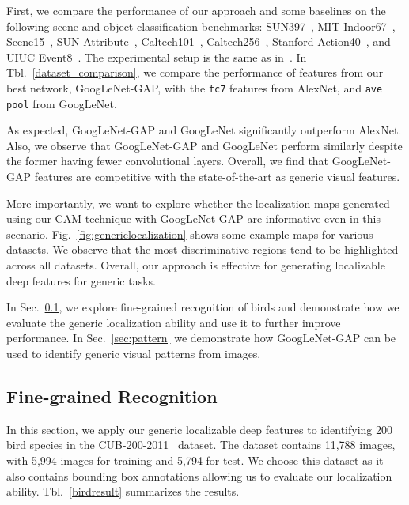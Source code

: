 \documentclass[10pt,twocolumn,letterpaper]{article}
\begin{document}
First, we compare the performance of our approach and some baselines on the following scene and object classification benchmarks: SUN397~\cite{xiao2010sun}, MIT Indoor67~\cite{quattoni2009recognizing}, Scene15~\cite{lazebnik2006beyond}, SUN Attribute~\cite{patterson2012sun}, Caltech101~\cite{fei2007learning}, Caltech256~\cite{griffin2007caltech}, Stanford Action40~\cite{yao2011human}, and UIUC Event8~\cite{li2007and}. The experimental setup is the same as in~\cite{zhou2014learning}. In Tbl.~\ref{dataset_comparison}, we compare the performance of features from our best network, GoogLeNet-GAP, with the \texttt{fc7} features from AlexNet, and \texttt{ave pool} from GoogLeNet. 

As expected, GoogLeNet-GAP and GoogLeNet significantly outperform AlexNet. Also, we observe that GoogLeNet-GAP and GoogLeNet perform similarly despite the former having fewer convolutional layers. Overall, we find that GoogLeNet-GAP features are competitive with the state-of-the-art as generic visual features.

More importantly, we want to explore whether the localization maps generated using our CAM technique with GoogLeNet-GAP are informative even in this scenario. Fig.~\ref{fig:genericlocalization} shows some example maps for various datasets. We observe that the most discriminative regions tend to be highlighted across all datasets. Overall, our approach is effective for generating localizable deep features for generic tasks.

In Sec.~\ref{sec:finegrained}, we explore fine-grained recognition of birds and demonstrate how we evaluate the generic localization ability and use it to further improve performance. In Sec.~\ref{sec:pattern} we demonstrate how GoogLeNet-GAP can be used to identify generic visual patterns from images.














\subsection{Fine-grained Recognition}
\label{sec:finegrained}

In this section, we apply our generic localizable deep features to identifying 200 bird species in the CUB-200-2011~\cite{WelinderEtal2010} dataset. The dataset contains 11,788 images, with 5,994 images for training and 5,794 for test. We choose this dataset as it also contains bounding box annotations allowing us to evaluate our localization ability. Tbl.~\ref{birdresult} summarizes the results.
\end{document}

